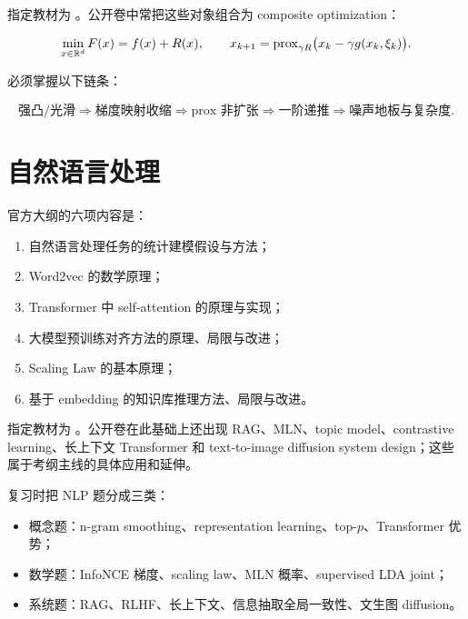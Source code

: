 指定教材为 \textcite{nesterov2018convex,beck2017first}。公开卷中常把这些对象组合为 composite optimization：

\[
  \min_{x\in \mathbb{R}^d} F(x) = f(x) + R(x),
  \qquad
  x_{k+1} = \operatorname{prox}_{\gamma R}\bigl(x_k-\gamma g(x_k,\xi_k)\bigr).
\]

必须掌握以下链条：

\[
  \text{强凸/光滑}
  \Longrightarrow
  \text{梯度映射收缩}
  \Longrightarrow
  \text{prox 非扩张}
  \Longrightarrow
  \text{一阶递推}
  \Longrightarrow
  \text{噪声地板与复杂度}.
\]

\OptimizationTextbooks

\section{自然语言处理}

官方大纲的六项内容是：

\begin{enumerate}
  \item 自然语言处理任务的统计建模假设与方法；
  \item Word2vec 的数学原理；
  \item Transformer 中 self-attention 的原理与实现；
  \item 大模型预训练对齐方法的原理、局限与改进；
  \item Scaling Law 的基本原理；
  \item 基于 embedding 的知识库推理方法、局限与改进。
\end{enumerate}

指定教材为 \textcite{jurafsky2026slp,goldberg2017nnnlp}。公开卷在此基础上还出现 RAG、MLN、topic model、contrastive learning、长上下文 Transformer 和 text-to-image diffusion system design；这些属于考纲主线的具体应用和延伸。

复习时把 NLP 题分成三类：

\begin{itemize}
  \item 概念题：n-gram smoothing、representation learning、top-\(p\)、Transformer 优势；
  \item 数学题：InfoNCE 梯度、scaling law、MLN 概率、supervised LDA joint；
  \item 系统题：RAG、RLHF、长上下文、信息抽取全局一致性、文生图 diffusion。
\end{itemize}

\NLPTextbooks
